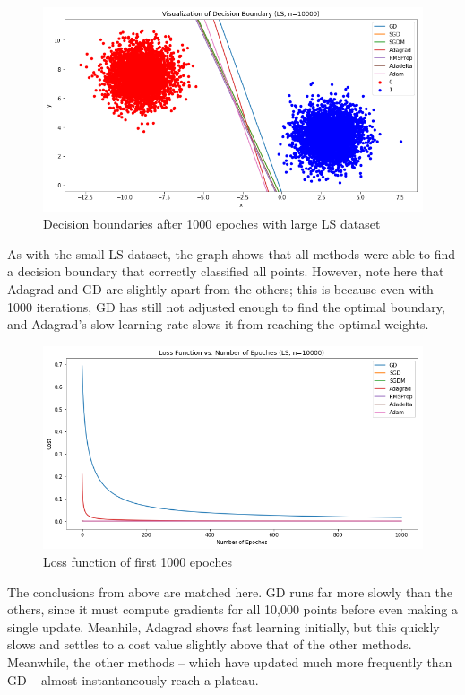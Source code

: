 \documentclass[twoside,11pt]{homework}
\begin{document}
\begin{figure}[H]
		\centering
		\includegraphics[scale=.5]{q5/sep_10000/lines_n10000.png}
		\caption{Decision boundaries after 1000 epoches with large LS dataset}
	\end{figure}
As with the small LS dataset, the graph shows that all methods were able to find a decision boundary that correctly classified all points. However, note here that Adagrad and GD are slightly apart from the others; this is because even with 1000 iterations, GD has still not adjusted enough to find the optimal boundary, and Adagrad's slow learning rate slows it from reaching the optimal weights.

	\begin{figure}[H]
		\centering
		\includegraphics[scale=.5]{q5/sep_10000/loss_n10000.png}
		\caption{Loss function of first 1000 epoches}
	\end{figure}

The conclusions from above are matched here. GD runs far more slowly than the others, since it must compute gradients for all 10,000 points before even making a single update. Meanhile, Adagrad shows fast learning initially, but this quickly slows and settles to a cost value slightly above that of the other methods. Meanwhile, the other methods -- which have updated much more frequently than GD -- almost instantaneously reach a plateau.
\end{document}
